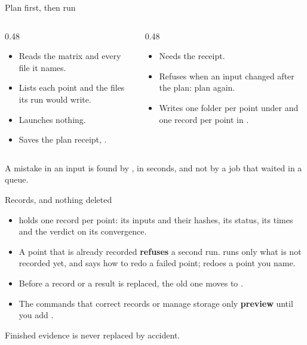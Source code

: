 \begin{frame}{Plan first, then run}
\begin{columns}[T]
\begin{column}{0.48\textwidth}
\begin{block}{}
\begin{itemize}\small
  \item Reads the matrix and every file it names.
  \item Lists each point and the files its run would write.
  \item Launches nothing.
  \item Saves the plan receipt, .
\end{itemize}
\end{block}
\end{column}
\begin{column}{0.48\textwidth}
\begin{block}{}
\begin{itemize}\small
  \item Needs the receipt.
  \item Refuses when an input changed after the plan: plan again.
  \item Writes one folder per point under  and one record per
        point in .
\end{itemize}
\end{block}
\end{column}
\end{columns}
\begin{takeaway}A mistake in an input is found by , in seconds,
and not by a job that waited in a queue.\end{takeaway}
\end{frame}

\begin{frame}{Records, and nothing deleted}
\begin{itemize}
  \item {} holds one record per point: its inputs and their
        hashes, its status, its times and the verdict on its convergence.
  \item A point that is already recorded \textbf{refuses} a second run.
         runs only what is not recorded yet, and says how to
        redo a failed point;  redoes a point you name.
  \item Before a record or a result is replaced, the old one moves to
        .
  \item The commands that correct records or manage storage only
        \textbf{preview} until you add .
\end{itemize}
\begin{takeaway}Finished evidence is never replaced by accident.\end{takeaway}
\end{frame}

